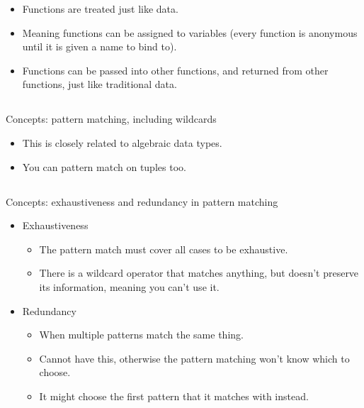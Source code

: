 \begin{itemize}[noitemsep]
\item Functions are treated just like data.
\item Meaning functions can be assigned to variables (every function is anonymous until it is given a name to bind to).
\item Functions can be passed into other functions, and returned from other functions, just like traditional data.
\end{itemize}

\subsection{}
Concepts: pattern matching, including wildcards

\begin{itemize}[noitemsep]
\item This is closely related to algebraic data types.
\item You can pattern match on tuples too.
\end{itemize}

\subsection{}
Concepts: exhaustiveness and redundancy in pattern matching

\begin{itemize}
\item Exhaustiveness
  \begin{itemize}[noitemsep]
  \item The pattern match must cover all cases to be exhaustive.
  \item There is a wildcard operator \texttt{\textunderscore{}} that matches anything, but doesn't preserve its information, meaning you can't use it.
  \end{itemize}

\item Redundancy
  \begin{itemize}[noitemsep]
  \item When multiple patterns match the same thing.
  \item Cannot have this, otherwise the pattern matching won't know which to choose.
  \item It might choose the first pattern that it matches with instead.
  \end{itemize}
\end{itemize}

